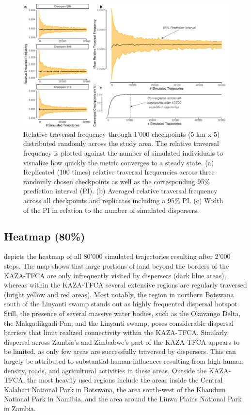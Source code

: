 \documentclass[abstract=on,10pt,a4paper,bibliography=totocnumbered]{article}
\begin{document}
\begin{figure}
  \begin{center}
    \includegraphics[width=\textwidth]{99_Convergence}
    \caption{Relative traversal frequency through 1'000 checkpoints (5 km x 5)
    distributed randomly across the study area. The relative traversal frequency
    is plotted against the number of simulated individuals to visualize how
    quickly the metric converges to a steady state. (a) Replicated (100 times)
    relative traversal frequencies across three randomly chosen checkpoints as
    well as the corresponding 95\% prediction interval (PI). (b) Averaged
    relative traversal frequency across all checkpoints and replicates including
    a 95\% PI. (c) Width of the PI in relation to the number of simulated
    dispersers.}
    \label{Convergence}
  \end{center}
\end{figure}

\subsection{Heatmap (80\%)}
 depicts the heatmap of all 80'000 simulated trajectories
resulting after 2'000 steps. The map shows that large portions of land beyond
the borders of the KAZA-TFCA are only infrequently visited by dispersers (dark
blue areas), whereas within the KAZA-TFCA several extensive regions are
regularly traversed (bright yellow and red areas). Most notably, the region in
northern Botswana south of the Linyanti swamp stands out as highly frequented
dispersal hotspot. Still, the presence of several massive water bodies, such as
the Okavango Delta, the Makgadikgadi Pan, and the Linyanti swamp, poses
considerable dispersal barriers that limit realized connectivity within the
KAZA-TFCA. Similarly, dispersal across Zambia's and Zimbabwe's part of the
KAZA-TFCA appears to be limited, as only few areas are successfully traversed by
dispersers. This can largely be attributed to substantial human influences
resulting from high human density, roads, and agricultural activities in these
areas. Outside the KAZA-TFCA, the most heavily used regions include the areas
inside the Central Kalahari National Park in Botswana, the area south-west of
the Khaudum National Park in Namibia, and the area around the Liuwa Plains
National Park in Zambia.
\end{document}
